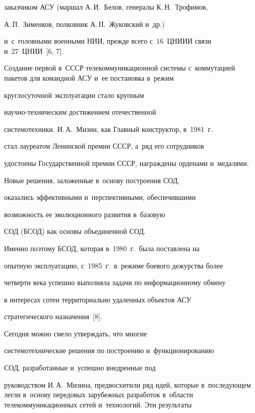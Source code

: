 заказчиком АСУ (маршал А.\,И.~Белов, генералы К.\,Н.~Трофимов,


А.\,П.~Зименков, полковник А.\,П.~Жуковский и~др.)\


и~с~головными военными НИИ, прежде всего с~16~ЦНИИИ связи и~27~ЦНИИ~[6, 7].





     Создание первой в~СССР телекоммуникационной системы с~коммутацией пакетов для командной АСУ и~ее постановка в~режим


круглосуточной эксплуатации стало крупным


     на\-уч\-но-тех\-ни\-че\-ским достижением отечественной


системотехники. И.\,А.~Мизин, как Главный конструктор, в~1981~г.\


стал лауреатом Ленинской премии СССР, а~ряд его сотрудников


удостоены Государственной премии СССР, награждены орденами и~медалями.





     Новые решения, заложенные в~основу построения СОД,


оказались эффективными и~перспективными, обеспечившими


возможность ее эволюционного развития в~базовую


СОД (БСОД) как основы объединенной СОД.





     Именно поэтому БСОД, которая в~1980~г.\ была поставлена на


опытную эксплуатацию, с~1985~г.\ в~режиме боевого дежурства более


четверти века успешно выполняла задачи по информационному обмену


в интересах сотен территориально удаленных объектов АСУ


стратегического назначения~[8].





     Сегодня можно смело утверждать, что многие


системотехнические решения по построению и~функционированию


СОД, разработанные и~успешно внедренные под


руководством И.\,А.~Мизина, предвосхитили ряд идей, которые в~последующем легли в~основу передовых зарубежных разработок в~области телекоммуникационных сетей и~технологий. Эти результаты


